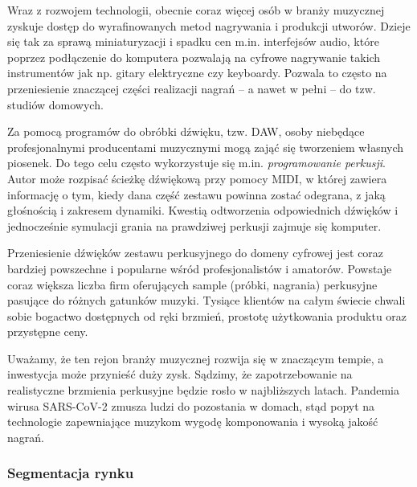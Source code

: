 \documentclass[12pt]{article}
\begin{document}
Wraz z rozwojem technologii, obecnie coraz więcej osób w branży muzycznej zyskuje dostęp do wyrafinowanych metod nagrywania i produkcji utworów.
Dzieje się tak za sprawą miniaturyzacji i spadku cen m.in. interfejsów audio, które poprzez podłączenie do komputera pozwalają na cyfrowe nagrywanie takich instrumentów jak np. gitary elektryczne czy keyboardy.
Pozwala to często na przeniesienie znaczącej części realizacji nagrań -- a nawet w pełni -- do tzw. studiów domowych.

Za pomocą programów do obróbki dźwięku, tzw. DAW, osoby niebędące profesjonalnymi producentami muzycznymi mogą zająć się tworzeniem własnych piosenek.
Do tego celu często wykorzystuje się m.in. \emph{programowanie perkusji}.
Autor może rozpisać ścieżkę dźwiękową przy pomocy MIDI, w której zawiera informację o tym, kiedy dana część zestawu powinna zostać odegrana, z jaką głośnością i zakresem dynamiki.
Kwestią odtworzenia odpowiednich dźwięków i jednocześnie symulacji grania na prawdziwej perkusji zajmuje się komputer.

Przeniesienie dźwięków zestawu perkusyjnego do domeny cyfrowej jest coraz bardziej powszechne i popularne wśród profesjonalistów i amatorów.
Powstaje coraz większa liczba firm oferujących sample (próbki, nagrania) perkusyjne pasujące do różnych gatunków muzyki.
Tysiące klientów na całym świecie chwali sobie bogactwo dostępnych od ręki brzmień, prostotę użytkowania produktu oraz przystępne ceny.

Uważamy, że ten rejon branży muzycznej rozwija się w znaczącym tempie, a inwestycja może przynieść duży zysk.
Sądzimy, że zapotrzebowanie na realistyczne brzmienia perkusyjne będzie rosło w najbliższych latach.
Pandemia wirusa SARS-CoV-2 zmusza ludzi do pozostania w domach, stąd popyt na technologie zapewniające muzykom wygodę komponowania i wysoką jakość nagrań.


\subsubsection{Segmentacja rynku}

\end{document}
